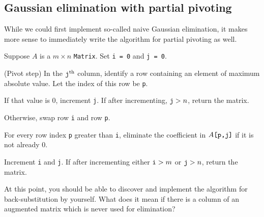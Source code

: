\documentclass[m3380-lec-main.tex]{subfiles}
\begin{document}
\subsection{Gaussian elimination with partial pivoting}
While we could first implement so-called naive Gaussian elimination, it makes more sense to immediately write the algorithm for partial pivoting as well.

\begin{alg} Suppose $A$ is a $m\times n$ \verb|Matrix|. Set \verb|i = 0| and \verb|j = 0|.
\begin{enum}
\item (Pivot step) In the $\verb|j|^\text{th}$ column, identify a row containing an element of maximum absolute value. Let the index of this row be \verb|p|.
\begin{enuma}
\item If that value is 0, increment \verb|j|. If after incrementing, $\verb|j|>n$, return the matrix.
\item Otherwise, swap row \verb|i| and row \verb|p|.
\end{enuma}
\item For every row index \verb|p| greater than \verb|i|, eliminate the coefficient in $A\verb|[p,j]|$ if it is not already 0.
\item Increment \verb|i| and \verb|j|. If after incrementing either $\verb|i|>m$ or $\verb|j|>n$, return the matrix.
\end{enum}
\end{alg}

\noindent At this point, you should be able to discover and implement the algorithm for back-substitution by yourself. What does it mean if there is a column of an augmented matrix which is never used for elimination?
\end{document}
